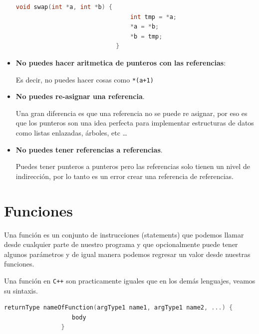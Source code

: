 \documentclass[12pt, fleqn]{report}                             %
\theoremstyle{break}                                            %
\newcommand{\textCode}[1]  { \texttt{#1} }                      %
\newcommand{\Cpp}{\ignorespaces\textCode{C++}}                  %
\begin{document}
\begin{itemize}
\begin{lstlisting}[language=C++, gobble=28]
                            void swap(int *a, int *b) {
                                int tmp = *a;
                                *a = *b;
                                *b = tmp;
                            }

                        \end{lstlisting}

                    \item \textbf{No puedes hacer aritmetica de punteros con las referencias}:

                        Es decir, no puedes hacer cosas como \textCode{*(a+1)}

                    \item \textbf{No puedes re-asignar una referencia}.

                        Una gran diferencia es que una referencia no se puede re asignar, por eso
                        es que los punteros son una idea perfecta para implementar estructuras de datos
                        como listas enlazadas, árboles, etc \dots

                    \item \textbf{No puedes tener referencias a referencias}.
                    
                        Puedes tener punteros a punteros pero las referencias solo tienen un nivel de indirección,
                        por lo tanto es un error crear una referencia de referencias.
                \end{itemize}


  

        \clearpage
        \section{Funciones}

            Una función es un conjunto de instrucciones (statements) que podemos llamar desde cualquier
            parte de nuestro programa y que opcionalmente puede tener algunos parámetros y de igual
            manera podemos regresar un valor desde nuestras funciones. 

            Una función en \Cpp son practicamente iguales que en los demás lenguajes, veamos su sintaxis.
            \begin{lstlisting}[language=C++, gobble=16]
                returnType nameOfFunction(argType1 name1, argType1 name2, ...) {
                   body
                }
            \end{lstlisting}
\end{document}
